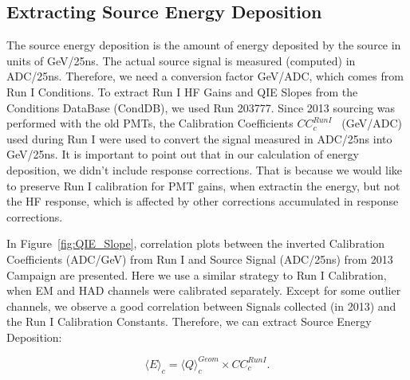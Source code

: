 \subsection{Extracting Source Energy Deposition}
The source energy deposition is the amount of energy deposited by the source in
units of GeV/25\unit{ns}. The actual source signal is measured (computed) in
ADC/25\unit{ns}. Therefore, we need a conversion factor GeV/ADC, which comes from
Run I Conditions. To extract Run I HF Gains and QIE Slopes from the Conditions DataBase (CondDB), we used Run 203777. Since 2013 sourcing was performed with the old PMTs, the
Calibration Coefficients ${CC}^{Run I}_{c}$~ (GeV/ADC) used during Run I were used to convert
the signal measured in ADC/25\unit{ns} into GeV/25\unit{ns}. It is important to point out that in our calculation of energy deposition, we didn't include response corrections. That is because we would like to preserve Run I calibration for PMT gains, when extractin the energy, but not the HF response, which is affected by other corrections accumulated in response corrections.

In Figure~\ref{fig:QIE_Slope}, correlation plots between the inverted Calibration
Coefficients (ADC/GeV) from Run I and Source Signal (ADC/25\unit{ns}) from 2013
Campaign are presented. Here we use a similar strategy to Run I Calibration, when
EM and HAD channels were calibrated separately. Except for some outlier channels,
we observe a good correlation between Signals collected (in 2013) and the Run I
Calibration Constants. Therefore, we can extract Source Energy Deposition:

\begin{center}
	\begin{equation}
		\label{eq:Edep}
		{\langle{E}\rangle}_{c} = {\langle{Q}\rangle}^{Geom}_{c} \times {CC^{Run I}_{c}}.
	\end{equation}
\end{center}



